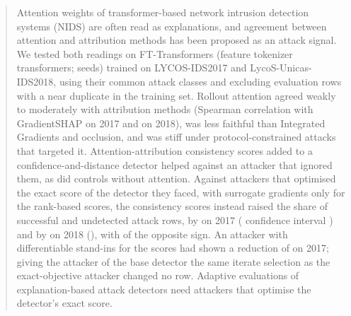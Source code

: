 \begin{abstract}
Attention weights of transformer-based network intrusion detection systems (NIDS) are often read as explanations, and
agreement between attention and attribution methods has been proposed as an attack signal.
We tested both readings on FT-Transformers (feature tokenizer transformers; \nSeeds{} seeds) trained on LYCOS-IDS2017
and LycoS-Unicas-IDS2018, using their \nCommonClasses{} common attack classes and excluding evaluation rows with a near
duplicate in the training set.
Rollout attention agreed weakly to moderately with attribution methods (Spearman correlation with GradientSHAP
\spRolloutGShapVoneSeventeen{} on 2017 and \spRolloutGShapVoneEighteen{} on 2018), was less faithful than Integrated
Gradients and occlusion, and was stiff under protocol-constrained attacks that targeted it.
Attention-attribution consistency scores added to a confidence-and-distance detector helped against an attacker that
ignored them, as did controls without attention.
Against attackers that optimised the exact score of the detector they faced, with surrogate gradients only for the
\nRankScores{} rank-based scores, the consistency scores instead raised the share of successful and undetected attack
rows, by \axHeadVoneSeventeenAbs{} on 2017 (\paramCILevel{} confidence interval \axHeadVoneSeventeenCI) and by
\axHeadVoneEighteenAbs{} on 2018 (\axHeadVoneEighteenCI), with \axHeadOppSeedsPhrase{} of the
opposite sign.
An attacker with differentiable stand-ins for the scores had shown a reduction of \axStandinVoneSeventeenAbs{} on 2017;
giving the attacker of the base detector the same iterate selection as the exact-objective attacker changed no row.
Adaptive evaluations of explanation-based attack detectors need attackers that optimise the detector's exact score.
\end{abstract}

